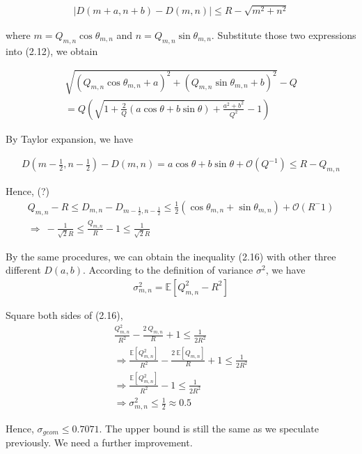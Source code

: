 \documentclass[letterpaper]{article}
\numberwithin{equation}{section} %
\numberwithin{figure}{section} %
\numberwithin{table}{section} %
\begin{document}
\begin{align} 
|D(m+a, n+b)-D(m,n)|\leq R-\sqrt{m^2+n^2} 
\end{align}

\noindent
where $m=Q_{m,n}\cos \theta_{m,n}$ and $n=Q_{m,n}\sin \theta_{m,n}$. Substitute those two expressions into (2.12), we obtain

\begin{align} 
\sqrt{(Q_{m,n}\cos \theta_{m,n}+a)^2+(Q_{m,n}\sin \theta_{m,n} +b)^2}-Q \\
=Q(\sqrt{1+\frac{2}{Q}(a\cos \theta+b\sin \theta)+\frac{a^2+b^2}{Q^2}}-1)
\end{align}

\noindent
By Taylor expansion, we have 

\begin{align} 
D(m-\frac{1}{2}, n-\frac{1}{2})-D(m,n) = a\cos \theta +b\sin \theta + \mathcal{O}(Q^{-1}) \leq R-Q_{m,n}
\end{align}

\noindent
Hence, (?)
\begin{align} 
Q_{m,n}-R \leq D_{m,n}-D_{m-\frac{1}{2},n-\frac{1}{2}} \leq \frac{1}{2}(\cos \theta_{m,n}+\sin \theta_{m,n})+\mathcal{O}(R^-1) \\
\Rightarrow \ -\frac{1}{\sqrt{2}R} \leq \frac{Q_{m,n}}{R}-1 \leq \frac{1}{\sqrt{2}R}
\end{align}

\noindent 
By the same procedures, we can obtain the inequality (2.16) with other three different $D(a,b)$. According to the definition of variance $\sigma^2$, we have 
\begin{align} 
\sigma_{m,n}^2 = \mathbb{E}[Q_{m,n}^2-R^2]
\end{align}

\noindent
Square both sides of (2.16),
\begin{align} 
\frac{Q_{m,n}^2}{R^2}-\frac{2\ Q_{m,n}}{R}+1 \leq \frac{1}{2R^2} \\ \Rightarrow \frac{\mathbb{E}[Q_{m,n}^2]}{R^2}-\frac{2\ \mathbb{E}[Q_{m,n}]}{R}+1 \leq \frac{1}{2R^2} \\
\Rightarrow \frac{\mathbb{E}[Q_{m,n}^2]}{R^2}-1 \leq \frac{1}{2R^2} \\
\Rightarrow \sigma_{m,n}^2 \leq \frac{1}{2} \approx 0.5
\end{align}

\noindent
Hence, $\sigma_{geom} \leq 0.7071$. The upper bound is still the same as we speculate previously. We need a further improvement.
\end{document}
